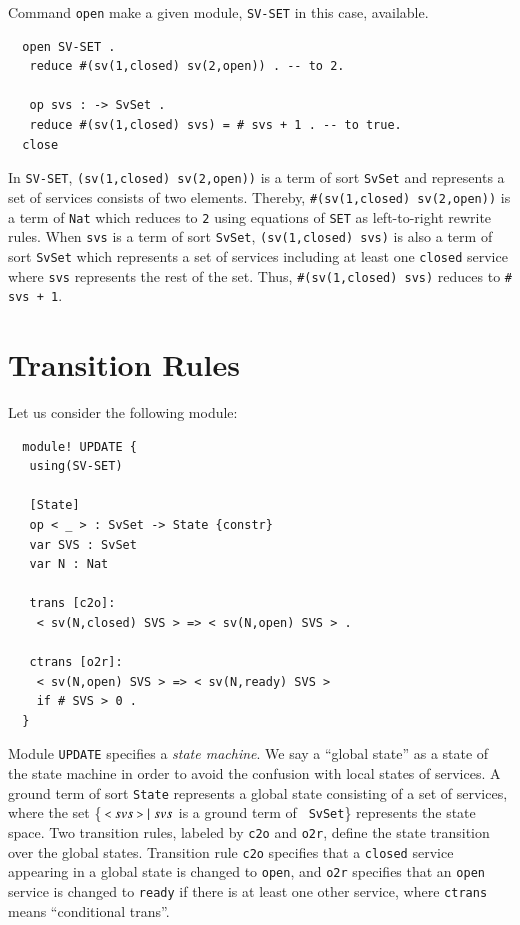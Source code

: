 \documentclass[12pt]{report}
\newcommand{\mbstt}[1]{\mbox{\small{\tt {#1}}}}
\newcommand{\stt}[1]{{\small{\tt {#1}}}}
\begin{document}
Command {\tt open} make a given module, {\tt SV-SET}
in this case, available.
\small
\begin{verbatim}
  open SV-SET .
   reduce #(sv(1,closed) sv(2,open)) . -- to 2.

   op svs : -> SvSet .
   reduce #(sv(1,closed) svs) = # svs + 1 . -- to true.
  close
\end{verbatim}
\normalsize
In {\tt SV-SET}, \stt{(sv(1,closed) sv(2,open))} is a term of sort
{\tt SvSet} and represents a set of services consists of two elements.
Thereby, \stt{\#(sv(1,closed) sv(2,open))} is a term of {\tt Nat} which
reduces to {\tt 2} using equations of {\tt SET} as left-to-right
rewrite rules. When {\tt svs} is a term of sort {\tt SvSet},
\stt{(sv(1,closed) svs)} is also a term of sort {\tt SvSet} which
represents a set of services including at least one {\tt closed}
service where {\tt svs} represents the rest of the set. Thus,
\stt{\#(sv(1,closed) svs)} reduces to \stt{\# svs + 1}.

\section{Transition Rules}
\label{sec:rules}
Let us consider the following module:
\small
\begin{verbatim}
  module! UPDATE {
   using(SV-SET)
  
   [State]
   op < _ > : SvSet -> State {constr}
   var SVS : SvSet    
   var N : Nat
  
   trans [c2o]: 
    < sv(N,closed) SVS > => < sv(N,open) SVS > .
  
   ctrans [o2r]: 
    < sv(N,open) SVS > => < sv(N,ready) SVS >
    if # SVS > 0 . 
  }
\end{verbatim}
\normalsize
Module {\tt UPDATE} specifies a {\it state machine}. We say a ``global state''
as a state of the state machine in order to avoid the confusion with
local states of services. A ground term of sort {\tt State} represents
a global state consisting of a set of services, where the set
\{$\ \mbstt{<}\ svs\ \mbstt{>}\mid svs$ is a ground term of {\tt
  SvSet}\} represents the state space. Two transition rules, labeled
by {\tt c2o} and {\tt o2r}, define the state transition over the
global states.  Transition rule {\tt c2o} specifies that a {\tt closed}
service appearing in a global state is changed to {\tt open}, and {\tt o2r}
specifies that an {\tt open} service is changed to {\tt ready} if
there is at least one other service, where {\tt ctrans} means ``conditional
trans''.
\end{document}
